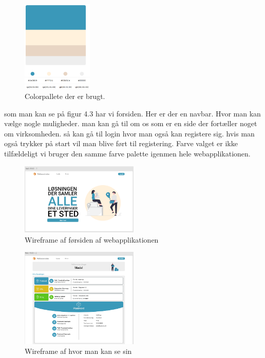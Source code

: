 \begin{figure} 
    \includegraphics[width=0.3\textwidth]{./Pictures/Colorpallete.png}
    \caption{Colorpallete der er brugt.}
    \label{fig:Colorpallete}
\end{figure}

som man kan se på figur 4.3 har vi forsiden. Her er der en navbar. Hvor man kan vælge nogle muligheder. man
kan gå til om os som er en side der fortæller noget om virksomheden. så kan gå til login hvor man også kan registere sig.
hvis man også trykker på start vil man blive ført til registering. Farve valget er ikke tilfældeligt vi bruger den samme farve
palette igenmen hele webapplikationen. 

\begin{figure} 
    \includegraphics[width=0.5\textwidth]{Pictures/Wireframe1.png}
    \caption{Wireframe af førsiden af webapplikationen}
     \label{fig:Wireframe1}
  \end{figure}

  

  \begin{figure} 
    \includegraphics[width=0.5\textwidth]{Pictures/Wireframe2.png}
    \caption{Wireframe af hvor man kan se sin}
     \label{fig:Wireframe2}
  \end{figure}